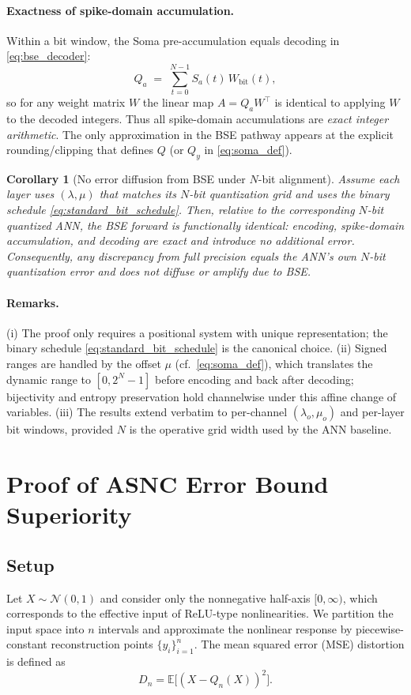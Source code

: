 \documentclass{article}
\theoremstyle{plain}
\newtheorem{corollary}[theorem]{Corollary}
\theoremstyle{definition}
\theoremstyle{remark}
\begin{document}
\paragraph{Exactness of spike-domain accumulation.}
Within a bit window, the Soma pre-accumulation equals decoding in \eqref{eq:bse_decoder}:
\[
Q_a \;=\; \sum_{t=0}^{N-1} S_a(t)\,W_{\mathrm{bit}}(t),
\]
so for any weight matrix $W$ the linear map $A=Q_a W^\top$ is identical to applying $W$ to the decoded integers. Thus all spike-domain accumulations are \emph{exact integer arithmetic}. The only approximation in the BSE pathway appears at the explicit rounding/clipping that defines $Q$ (or $Q_y$ in \eqref{eq:soma_def}).

\begin{corollary}[No error diffusion from BSE under $N$-bit alignment]
\label{cor:no_diffusion}
Assume each layer uses $(\lambda,\mu)$ that matches its $N$-bit quantization grid and uses the binary schedule \eqref{eq:standard_bit_schedule}. Then, relative to the corresponding $N$-bit quantized ANN, the BSE forward is functionally identical: encoding, spike-domain accumulation, and decoding are exact and introduce \emph{no additional error}. Consequently, any discrepancy from full precision equals the ANN's own $N$-bit quantization error and does not diffuse or amplify due to BSE.
\end{corollary}

\paragraph{Remarks.}
(i) The proof only requires a positional system with unique representation; the binary schedule \eqref{eq:standard_bit_schedule} is the canonical choice.  
(ii) Signed ranges are handled by the offset $\mu$ (cf.\ \eqref{eq:soma_def}), which translates the dynamic range to $[0,2^N-1]$ before encoding and back after decoding; bijectivity and entropy preservation hold channelwise under this affine change of variables.  
(iii) The results extend verbatim to per-channel $(\lambda_o,\mu_o)$ and per-layer bit windows, provided $N$ is the operative grid width used by the ANN baseline.

\section{Proof of ASNC Error Bound Superiority}
\label{app:asnc_proof}

\subsection{Setup}
Let $X \sim \mathcal N(0,1)$ and consider only the nonnegative half-axis $[0,\infty)$, which corresponds to the effective input of ReLU-type nonlinearities.  
We partition the input space into $n$ intervals and approximate the nonlinear response by piecewise-constant reconstruction points $\{y_i\}_{i=1}^n$.  
The mean squared error (MSE) distortion is defined as
\[
D_n = \mathbb{E}\big[(X - Q_n(X))^2\big].
\]
\end{document}
